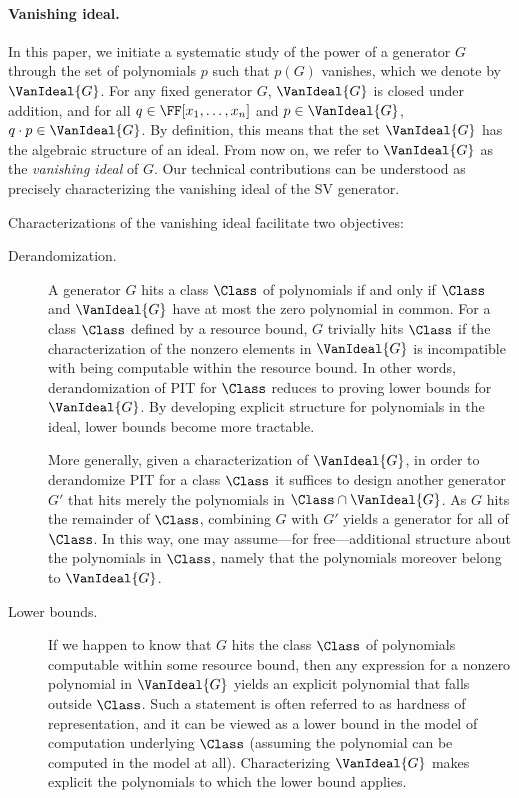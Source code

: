 \documentclass{toc}
\begin{document}
\paragraph{Vanishing ideal.}
In this paper, we initiate a systematic study of the power of a generator $G$ through the set of polynomials $p$ such that $p(G)$ vanishes, which we denote by \(\VanIdeal{G}\). For any fixed generator $G$, \(\VanIdeal{G}\) is closed under addition, and for all \(q\in \FF[x_1,\dots,x_n]\) and \(p\in \VanIdeal{G}\), \(q\cdot p\in \VanIdeal{G}\). By definition, this means that the set \(\VanIdeal{G}\) has the algebraic structure of an ideal. From now on, we refer to \(\VanIdeal{G}\) as the \emph{vanishing ideal} of $G$. Our technical contributions can be understood as precisely characterizing the vanishing ideal of the SV generator.

Characterizations of the vanishing ideal facilitate two objectives:
\begin{description}

  \item[Derandomization.]
   A generator $G$ hits a class $\Class$ of polynomials if and only if $\Class$ and $\VanIdeal{G}$ have at most the zero polynomial in common. For a class $\Class$ defined by a resource bound, $G$ trivially hits $\Class$ if the characterization of the nonzero elements in $\VanIdeal{G}$ is incompatible with being computable within the resource bound. In other words, derandomization of PIT for $\Class$ reduces to proving lower bounds for $\VanIdeal{G}$. By developing explicit structure for polynomials in the ideal, lower bounds become more tractable. 

   More generally, given a characterization of $\VanIdeal{G}$, in order to derandomize PIT for a class \(\Class\) it suffices to design another generator $G'$ that hits merely the polynomials in $\Class \cap \VanIdeal{G}$. As $G$ hits the remainder of $\Class$, combining $G$ with $G'$ yields a generator for all of $\Class$. In this way, one may assume---for free---additional structure about the polynomials in $\Class$, namely that the polynomials moreover belong to $\VanIdeal{G}$. 

  \item[Lower bounds.]
    If we happen to know that $G$ hits the class $\Class$ of polynomials
    computable within some resource bound,
    then any expression for a nonzero polynomial in $\VanIdeal{G}$ yields an
    explicit polynomial that falls outside $\Class$.
    Such a statement is often referred to as hardness of representation,
    and it can be viewed as a lower bound in the model of computation underlying
    $\Class$ (assuming the polynomial can be computed in the model at all).
    Characterizing \(\VanIdeal{G}\) makes explicit the polynomials to which
    the lower bound applies.

\end{description}
\end{document}
